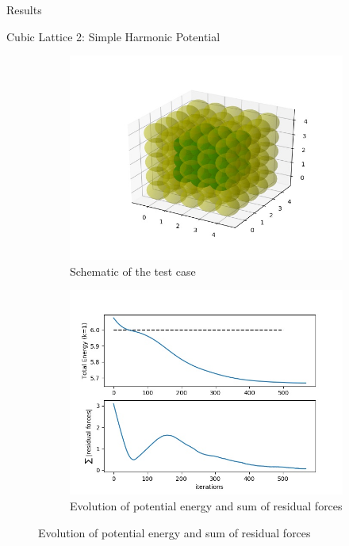 \documentclass[12pt]{article}
\begin{document}
\begin{section}{Results}
\begin{subsection}{Cubic Lattice 2: Simple Harmonic Potential}
\begin{figure}[h!]
    \begin{subfigure}{0.5\textwidth}
        \includegraphics[width=\linewidth]{images/5x5x5_model_r6.jpg}
        \caption{Schematic of the test case}
        \label{fig:sub1}
    \end{subfigure}
    \begin{subfigure}{0.5\textwidth}
        \includegraphics[width=\linewidth]{images/5by5by5_harmonic_r=6_UandF.jpeg}
        \caption{Evolution of potential energy and sum of residual forces}
        \label{fig:sub2}
    \end{subfigure}

\end{figure}
\end{subsection}
\end{section}
\end{document}
